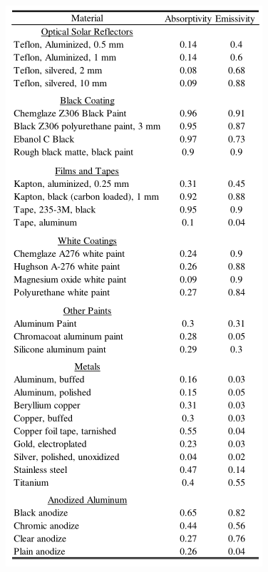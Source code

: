 \documentclass[final]{cubedoc}
\begin{document}
	\begin{figure}[h!]
		\centering
		\includegraphics[keepaspectratio, height=.8\textheight, width=\textwidth]{docs/small_sat_properties.png}
		\caption{\cite[p.111]{boushon2018}}
		\label{fig:fr4emiss}
	\end{figure}
	
\end{document}
